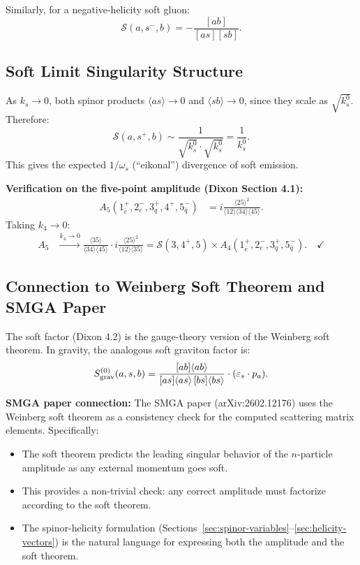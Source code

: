 Similarly, for a negative-helicity soft gluon:
\begin{equation}
  \mathcal{S}(a,s^-,b) = -\frac{[ab]}{[as][sb]}.
  \tag{Dixon 4.3}
\end{equation}

\subsection{Soft Limit Singularity Structure}

As $k_s\to 0$, both spinor products $\langle as\rangle\to 0$ and $\langle sb\rangle\to 0$,
since they scale as $\sqrt{k_s^0}$. Therefore:
\begin{equation}
  \mathcal{S}(a,s^+,b) \sim \frac{1}{\sqrt{k_s^0}\cdot\sqrt{k_s^0}} = \frac{1}{k_s^0}.
\end{equation}
This gives the expected $1/\omega_s$ (``eikonal'') divergence of soft emission.

\textbf{Verification on the five-point amplitude (Dixon Section 4.1):}
\begin{align}
  A_5(1_{\bar{e}}^+, 2_e^-, 3_q^+, 4^+, 5_{\bar{q}}^-)
  &= i\frac{\langle 25\rangle^2}{\langle 12\rangle\langle 34\rangle\langle 45\rangle}.
\end{align}
Taking $k_4\to 0$:
\begin{align}
  A_5 &\xrightarrow{k_4\to 0}
  \frac{\langle 35\rangle}{\langle 34\rangle\langle 45\rangle}\cdot
  i\frac{\langle 25\rangle^2}{\langle 12\rangle\langle 35\rangle}
  = \mathcal{S}(3,4^+,5)\times A_4(1_{\bar{e}}^+,2_e^-,3_q^+,5_{\bar{q}}^-). \quad\checkmark
\end{align}

\subsection{Connection to Weinberg Soft Theorem and SMGA Paper}

The soft factor (Dixon 4.2) is the gauge-theory version of the Weinberg soft theorem.
In gravity, the analogous soft graviton factor is:
\begin{equation}
  S^{(0)}_{\rm grav}(a,s,b) = \frac{[ab]\langle ab\rangle}
  {[as]\langle as\rangle\,[bs]\langle bs\rangle}\cdot(\varepsilon_s\cdot p_a).
\end{equation}

\textbf{SMGA paper connection:} The SMGA paper (arXiv:2602.12176) uses the Weinberg soft theorem
as a consistency check for the computed scattering matrix elements. Specifically:
\begin{itemize}
  \item The soft theorem predicts the leading singular behavior of the $n$-particle amplitude
        as any external momentum goes soft.
  \item This provides a non-trivial check: any correct amplitude must factorize according
        to the soft theorem.
  \item The spinor-helicity formulation (Sections~\ref{sec:spinor-variables}--\ref{sec:helicity-vectors})
        is the natural language for expressing both the amplitude and the soft theorem.
\end{itemize}


